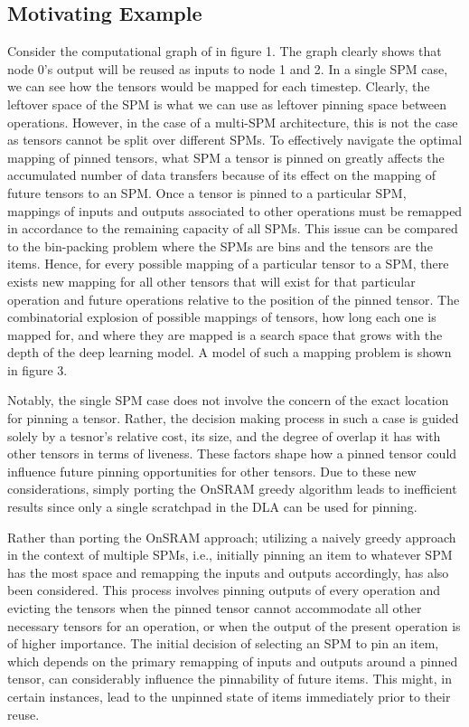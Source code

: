
\subsection{Motivating Example}


Consider the computational graph of in figure 1. The graph clearly shows that
node 0's output will be reused as inputs to node 1 and 2. In a single SPM case,
we can see how the tensors would be mapped for each timestep. Clearly, the
leftover space of the SPM is what we can use as leftover pinning space between
operations. However, in the case of a multi-SPM architecture, this is not the
case as tensors cannot be split over different SPMs. To effectively navigate
the optimal mapping of pinned tensors, what SPM a tensor is pinned on greatly
affects the accumulated number of data transfers because of its effect on the
mapping of future tensors to an SPM. Once a tensor is pinned to a particular
SPM, mappings of inputs and outputs associated to other operations must be
remapped in accordance to the remaining capacity of all SPMs. This issue can be
compared to the bin-packing problem where the SPMs are bins and the tensors are
the items. Hence, for every possible mapping of a particular tensor to a SPM,
there exists new mapping for all other tensors that will exist for that
particular operation and future operations relative to the position of the
pinned tensor. The combinatorial explosion of possible mappings of tensors,
how long each one is mapped for, and where they are mapped is a search space
that grows with the depth of the deep learning model. A model of such
a mapping problem is shown in figure 3.

Notably, the single SPM case does not involve the concern of the exact location for
pinning a tensor. Rather, the decision making process in such a case is guided
solely by a tesnor's relative cost, its size, and the degree of overlap it has
with other tensors in terms of liveness. These factors shape how a pinned
tensor could influence future pinning opportunities for other tensors.
Due to these new considerations, simply porting the OnSRAM greedy algorithm 
leads to inefficient results since only a single scratchpad in the DLA can
be used for pinning.

Rather than porting the OnSRAM approach; utilizing a naively greedy approach in
the context of multiple SPMs, i.e., initially pinning an item to whatever SPM
has the most space and remapping the inputs and outputs accordingly, has also
been considered. This process involves pinning outputs of every operation and
evicting the tensors when the pinned tensor cannot accommodate all other
necessary tensors for an operation, or when the output of the present operation
is of higher importance. The initial decision of selecting an SPM to pin an
item, which depends on the primary remapping of inputs and outputs around a
pinned tensor, can considerably influence the pinnability of future items. This
might, in certain instances, lead to the unpinned state of items immediately
prior to their reuse.

